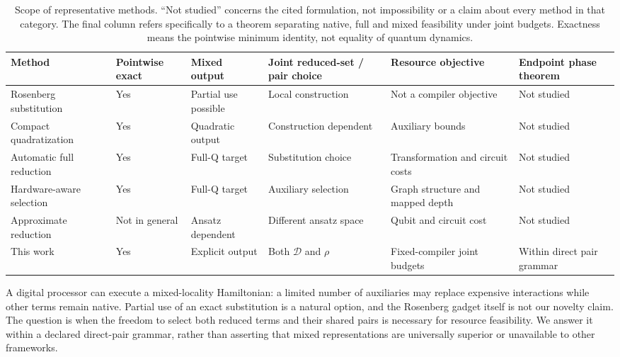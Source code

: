 \documentclass[a4paper,onecolumn,11pt,unpublished]{quantumarticle}
\theoremstyle{remark}
\begin{document}
\begin{table}[tbp]
\centering\footnotesize
\setlength{\tabcolsep}{3pt}
\renewcommand{\arraystretch}{1.18}
\caption{Scope of representative methods. ``Not studied'' concerns the cited formulation, not impossibility or a claim about every method in that category. The final column refers specifically to a theorem separating native, full and mixed feasibility under joint budgets. Exactness means the pointwise minimum identity, not equality of quantum dynamics.}
\label{tab:related-work-scope}
\begin{tabular}{@{}>{\raggedright\arraybackslash}p{.19\linewidth}>{\raggedright\arraybackslash}p{.10\linewidth}>{\raggedright\arraybackslash}p{.14\linewidth}>{\raggedright\arraybackslash}p{.16\linewidth}>{\raggedright\arraybackslash}p{.15\linewidth}>{\raggedright\arraybackslash}p{.12\linewidth}@{}}
\toprule
Method & Pointwise exact & Mixed output & Joint reduced-set / pair choice & Resource objective & Endpoint phase theorem\\
\midrule
Rosenberg substitution~\cite{Rosenberg1975,BorosGruber2014} & Yes & Partial use possible & Local construction & Not a compiler objective & Not studied\\
Compact quadratization~\cite{BorosCramaRodriguezHeck2020} & Yes & Quadratic output & Construction dependent & Auxiliary bounds & Not studied\\
Automatic full reduction~\cite{Schmidbauer2024,Schmidbauer2026} & Yes & Full-Q target & Substitution choice & Transformation and circuit costs & Not studied\\
Hardware-aware selection~\cite{Rovara2026} & Yes & Full-Q target & Auxiliary selection & Graph structure and mapped depth & Not studied\\
Approximate reduction~\cite{Dragoi2026} & Not in general & Ansatz dependent & Different ansatz space & Qubit and circuit cost & Not studied\\
This work & Yes & Explicit output & Both $\mathcal D$ and $\rho$ & Fixed-compiler joint budgets & Within direct pair grammar\\
\bottomrule
\end{tabular}
\end{table}

A digital processor can execute a mixed-locality Hamiltonian: a limited number of auxiliaries may replace expensive interactions while other terms remain native. Partial use of an exact substitution is a natural option, and the Rosenberg gadget itself is not our novelty claim. The question is when the freedom to select both reduced terms and their shared pairs is necessary for resource feasibility. We answer it within a declared direct-pair grammar, rather than asserting that mixed representations are universally superior or unavailable to other frameworks.
\end{document}
